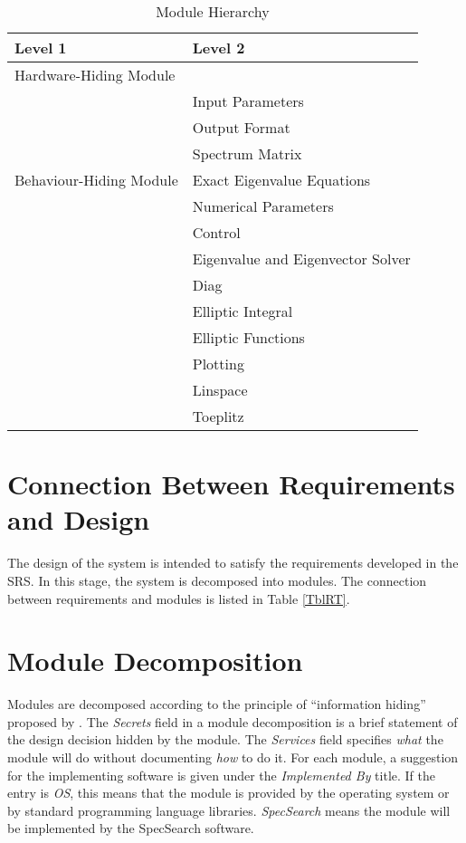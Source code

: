 \documentclass[12pt, titlepage]{article}
\newcommand{\progname}{SpecSearch}
\begin{document}
	\begin{table}[h]
		\centering
		\begin{tabular}{p{} p{}}
			\toprule
			\textbf{Level 1} & \textbf{Level 2}\\
			\midrule
			
			{Hardware-Hiding Module} & ~ \\
			\midrule
			
			\multirow{7}{0.3\textwidth}{Behaviour-Hiding Module} 
			& Input Parameters \\
			& Output Format \\
			& Spectrum Matrix \\
			& Exact Eigenvalue Equations \\
			& Numerical Parameters \\  
			& Control \\ 
			\midrule
			
			\multirow{3}{0.3\textwidth}{Software Decision Module} 
			& Eigenvalue and Eigenvector Solver \\
			& Diag\\
			& Elliptic Integral\\ 
			& Elliptic Functions\\ 
			& Plotting \\ 
			& Linspace \\
			& Toeplitz \\ 
			\bottomrule
			
		\end{tabular}
		\caption{Module Hierarchy}
		\label{TblMH}
	\end{table}
	
	\newpage 
	\section{Connection Between Requirements and Design} \label{SecConnection}
	
	The design of the system is intended to satisfy the requirements developed 
	in
	the SRS. In this stage, the system is decomposed into modules. The 
	connection
	between requirements and modules is listed in Table \ref{TblRT}.
	
	\section{Module Decomposition} \label{SecMD}
	
	
	Modules are decomposed according to the principle of ``information hiding''
	proposed by \citet{ParnasEtAl1984}. The \emph{Secrets} field in a module
	decomposition is a brief statement of the design decision hidden by the
	module. The \emph{Services} field specifies \emph{what} the module will do
	without documenting \emph{how} to do it. For each module, a suggestion for 
	the
	implementing software is given under the \emph{Implemented By} title. If the
	entry is \emph{OS}, this means that the module is provided by the operating
	system or by standard programming language libraries.  \emph{\progname{}} 
	means 
	the
	module will be implemented by the \progname{} software.
	
\end{document}
